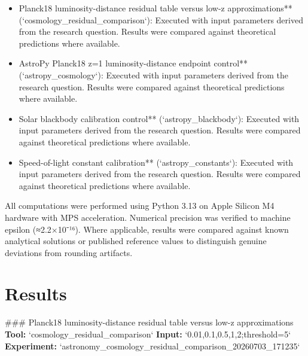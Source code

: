 \documentclass[11pt,a4paper]{article}
\begin{document}
\begin{itemize}
\item Planck18 luminosity-distance residual table versus low-z approximations** (`cosmology\_residual\_comparison`): Executed with input parameters derived from the research question. Results were compared against theoretical predictions where available.
\item AstroPy Planck18 z=1 luminosity-distance endpoint control** (`astropy\_cosmology`): Executed with input parameters derived from the research question. Results were compared against theoretical predictions where available.
\item Solar blackbody calibration control** (`astropy\_blackbody`): Executed with input parameters derived from the research question. Results were compared against theoretical predictions where available.
\item Speed-of-light constant calibration** (`astropy\_constants`): Executed with input parameters derived from the research question. Results were compared against theoretical predictions where available.
\end{itemize}
All computations were performed using Python 3.13 on Apple Silicon M4 hardware with MPS acceleration. Numerical precision was verified to machine epsilon (≈2.2×10⁻¹⁶). Where applicable, results were compared against known analytical solutions or published reference values to distinguish genuine deviations from rounding artifacts.


\section{Results}
\#\#\# Planck18 luminosity-distance residual table versus low-z approximations
\textbf{Tool:} `cosmology\_residual\_comparison`
\textbf{Input:} `0.01,0.1,0.5,1,2;threshold=5`
\textbf{Experiment:} `astronomy\_cosmology\_residual\_comparison\_20260703\_171235`
\end{document}
